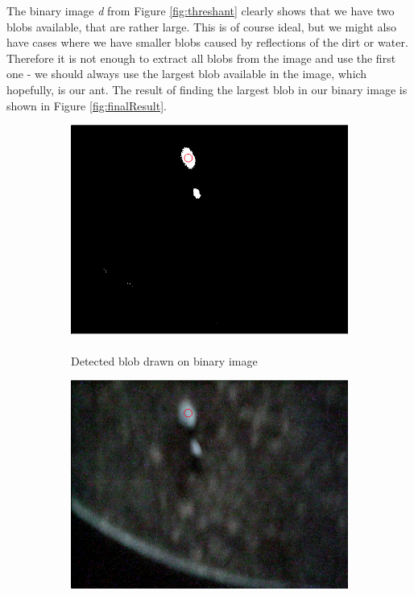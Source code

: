The binary image \emph{d} from Figure \ref{fig:threshant} clearly shows that we have two blobs available, that are rather large. This is of course ideal, but we might also have cases where we have smaller blobs caused by reflections of the dirt or water. Therefore it is not enough to extract all blobs from the image and use the first one - we should always use the largest blob available in the image, which hopefully, is our ant. The result of finding the largest blob in our binary image is shown in Figure \ref{fig:finalResult}.

\begin{figure}
    \captionsetup{justification=centering}
        \centering
        \begin{subfigure}[b]{0.45\textwidth}
                \includegraphics[scale = 0.25]{img/threshblob}
                \caption{\mbox{}\\Detected blob drawn on binary image}
        \end{subfigure}
		\quad
        \centering
        \begin{subfigure}[b]{0.45\textwidth}
                \includegraphics[scale = 0.25]{img/srcblob}

\end{subfigure}
\end{figure}
